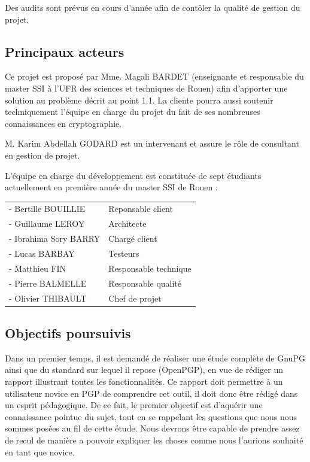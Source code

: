 \documentclass{../res/univ-projet}
\begin{document}
Des audits sont prévus en cours d'année afin de contôler la qualité de gestion du projet.

\subsection{Principaux acteurs}

Ce projet est proposé par Mme. Magali BARDET (enseignante et responsable du master SSI à l'UFR des sciences et techniques de Rouen) 
afin d'apporter une solution au problème décrit au point 1.1. La cliente pourra aussi soutenir techniquement l'équipe en charge du projet du 
fait de ses nombreuses connaissances en cryptographie.

M. Karim Abdellah GODARD est un intervenant et assure le rôle de consultant en gestion de projet.

L'équipe en charge du développement est constituée de sept étudiants actuellement en première année du master SSI de Rouen : 
\\

\begin{tabular}{ll}
- Bertille BOUILLIE & Reponsable client \\
- Guillaume LEROY & Architecte \\
- Ibrahima Sory BARRY & Chargé client \\
- Lucas BARBAY & Testeurs \\
- Matthieu FIN & Responsable technique \\
- Pierre BALMELLE & Responsable qualité \\
- Olivier THIBAULT & Chef de projet \\
\end{tabular}

\newpage

\subsection{Objectifs poursuivis}

Dans un premier temps, il est demandé de réaliser une étude complète de GnuPG ainsi que du standard sur lequel il repose (OpenPGP), en vue de 
rédiger un rapport illustrant toutes les fonctionnalités. Ce rapport doit permettre à un utilisateur novice en PGP de comprendre cet outil, 
il doit donc être rédigé dans un esprit pédagogique. De ce fait, le premier objectif est d'aquérir une connaissance pointue du sujet, tout en 
se rappelant les questions que nous nous sommes posées au fil de cette étude. Nous devrons être capable de prendre assez de recul de manière a 
pouvoir expliquer les choses comme nous l'aurions souhaité en tant que novice.
\end{document}
